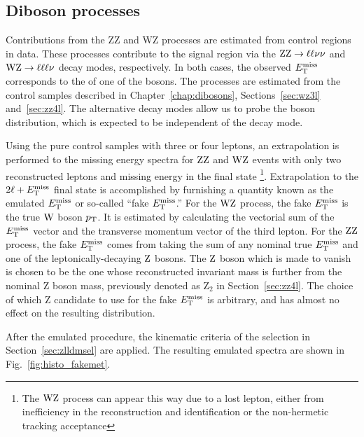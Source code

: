 
\subsection{Diboson processes}
\label{sec:vvbkg}
Contributions from the ZZ and WZ processes are estimated from control regions in data.
These processes contribute to the signal region via the
$\mathrm{Z}\mathrm{Z}\rightarrow\ell\ell\nu\nu$ and $\mathrm{W}\mathrm{Z}\rightarrow\ell\ell\ell\nu$ decay modes, respectively.
In both cases, the observed $E_\mathrm{T}^{\mathrm{miss}}$ corresponds to the \pt of one of the bosons.
The processes are estimated from the control samples described in Chapter~\ref{chap:dibosons}, Sections~\ref{sec:wz3l} and~\ref{sec:zz4l}. 
The alternative decay modes allow us to probe the boson \pt distribution, which is expected to be independent of the decay mode.

Using the pure control samples with three or four leptons, an extrapolation is performed
to the missing energy spectra for $\mathrm{Z}\mathrm{Z}$ and $\mathrm{W}\mathrm{Z}$ events 
with only two reconstructed leptons and missing energy in the final state
\footnote{The $\mathrm{W}\mathrm{Z}$ process can appear this way due to a lost lepton, either from inefficiency in the reconstruction and identification or the non-hermetic tracking acceptance}.
Extrapolation to the $2\ell+E_\mathrm{T}^{\mathrm{miss}}$ final state is accomplished by furnishing a quantity
known as the emulated $E_\mathrm{T}^{\mathrm{miss}}$ or so-called ``fake $E_\mathrm{T}^{\mathrm{miss}}$.''
For the $\mathrm{W}\mathrm{Z}$ process, the fake $E_\mathrm{T}^{\mathrm{miss}}$ is the true $\mathrm{W}$ boson $p_{\mathrm{T}}$.
It is estimated by calculating the vectorial sum of the $E_\mathrm{T}^{\mathrm{miss}}$ vector and the transverse momentum vector of the third lepton.
For the $\mathrm{Z}\mathrm{Z}$ process, the fake $E_\mathrm{T}^{\mathrm{miss}}$ comes from taking the sum of any nominal true $E_\mathrm{T}^{\mathrm{miss}}$ and one of the leptonically-decaying $\mathrm{Z}$ bosons.
The $\mathrm{Z}$ boson which is made to vanish is chosen to be the one whose reconstructed invariant
mass is further from the nominal Z boson mass, previously denoted
as $\mathrm{Z}_2$ in Section~\ref{sec:zz4l}.
The choice of which Z candidate to use for the fake $E_\mathrm{T}^{\mathrm{miss}}$ is arbitrary,
and has almost no effect on the resulting distribution.

After the emulated \met procedure, the kinematic criteria of the selection in
Section~\ref{sec:zlldmsel} are applied.
The resulting emulated \met spectra are shown in Fig.~\ref{fig:histo_fakemet}.

